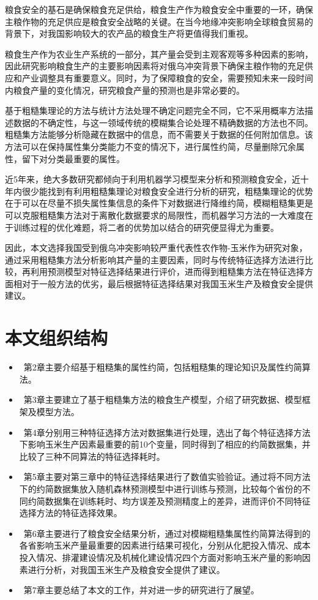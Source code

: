 粮食安全的基石是确保粮食充足供给，粮食生产作为粮食安全中重要的一环，确保主粮作物的充足供应是粮食安全战略的关键。在当今地缘冲突影响全球粮食贸易的背景下，对我国影响较大的农产品的粮食生产将更值得我们重视。

粮食生产作为农业生产系统的一部分，其产量会受到主观客观等多种因素的影响，因此研究影响粮食生产的主要影响因素将对俄乌冲突背景下确保主粮作物的充足供应和产业调整具有重要意义。同时，为了保障粮食的安全，需要预知未来一段时间内粮食产量的变化情况，研究粮食产量的预测也是非常必要的。

基于粗糙集理论的方法与统计方法处理不确定问题完全不同，它不采用概率方法描述数据的不确定性，与这一领域传统的模糊集合论处理不精确数据的方法也不同。粗糙集方法能够分析隐藏在数据中的信息，而不需要关于数据的任何附加信息。该方法可以在保持属性集分类能力不变的情况下，进行属性约简，尽量删除冗余属性，留下对分类最重要的属性。

近5年来，绝大多数研究都倾向于利用机器学习模型来分析和预测粮食安全，近十年内很少能找到有利用粗糙集理论对粮食安全进行分析的研究，粗糙集理论的优势在于可以在尽量不损失属性集信息的条件下对数据进行降维约简，模糊粗糙集更是可以克服粗糙集方法对于离散化数据要求的局限性，而机器学习方法的一大难度在于训练过程的优化难题，将二者的优势加以结合的研究便显得尤为重要。

因此，本文选择我国受到俄乌冲突影响较严重代表性农作物-玉米作为研究对象，通过采用粗糙集方法分析影响其产量的主要因素，同时与传统特征选择方法进行比较，再利用预测模型对特征选择结果进行评价，进而得到粗糙集方法在特征选择方面相对于一般方法的优劣，最后根据特征选择结果对我国玉米生产及粮食安全提供建议。
\section{本文组织结构}
\begin{itemize}
    \item \ 第2章主要介绍基于粗糙集的属性约简，包括粗糙集的理论知识及属性约简算法。
    \item \ 第3章主要建立了基于粗糙集方法的粮食生产模型，介绍了研究数据、模型框架及模型方法。
    \item \ 第4章分别用三种特征选择方法对数据集进行处理，选出了每个特征选择方法下影响玉米生产因素最重要的前10个变量，同时得到了相应的约简数据集，并比较了三种不同算法的特征选择耗时。
    \item \ 第5章主要对第三章中的特征选择结果进行了数值实验验证。通过将不同方法下的约简数据集放入随机森林预测模型中进行训练与预测，比较每个省份的不同约简数据集在训练耗时、均方误差及预测精度上的差异，进而评价不同特征选择方法的特征选择效果。
    \item \ 第6章主要进行了粮食安全结果分析，通过对模糊粗糙集属性约简算法得到的各省影响玉米产量最重要的因素进行结果可视化，分别从化肥投入情况、成本投入情况、排灌建设情况及机械化建设情况四个方面对影响玉米产量的影响因素进行分析，对我国玉米生产及粮食安全提供了建议。
    \item \ 第7章主要总结了本文的工作，并对进一步的研究进行了展望。
\end{itemize}
